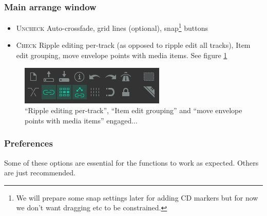 \documentclass[10pt,american]{article}
\begin{document}
\subsubsection{Main arrange window }
\begin{itemize}
\item \begin{flushleft} \textsc{Uncheck} Auto-crossfade, grid lines (optional),
snap\footnote{We will prepare some snap settings later for adding CD markers but
for now we don't want dragging etc to be constrained.} buttons
\par\end{flushleft}
\item \begin{flushleft} \textsc{Check} Ripple editing per-track (as opposed to
ripple edit all tracks), Item edit grouping, move envelope points with media
items. See figure \ref{Ripple-editing-per-track} \par\end{flushleft}

\end{itemize}
\begin{figure}
\begin{centering}
\includegraphics[scale=0.75]{user_guide_images/reaper_default_toolbar}
\par\end{centering}
\centering{}\caption{\label{Ripple-editing-per-track}\textquotedblleft Ripple
editing per-track\textquotedblright , \textquotedblleft Item edit
grouping\textquotedblright{} and \textquotedblleft move envelope points with
media items\textquotedblright{} engaged...}
\end{figure}


\subsubsection{Preferences }
\noindent\begin{flushleft} Some of these options are essential for the functions
to work as expected. Others are just recommended. \par\end{flushleft}
\end{document}
